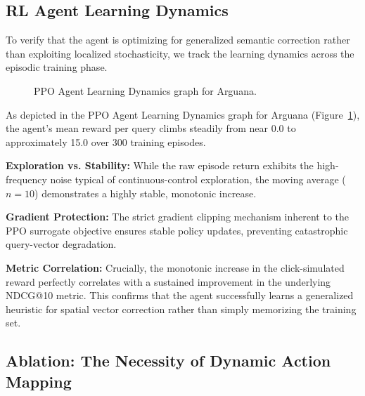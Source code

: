 \subsection{RL Agent Learning Dynamics}
To verify that the agent is optimizing for generalized semantic correction rather than exploiting localized stochasticity, we track the learning dynamics across the episodic training phase.

\begin{figure}[htbp]
  \centering
  \fbox{\rule[-.5cm]{0cm}{4cm} \rule[-.5cm]{4cm}{0cm}} %
  \caption{PPO Agent Learning Dynamics graph for Arguana.}
  \label{fig:learning_dynamics}
\end{figure}

As depicted in the PPO Agent Learning Dynamics graph for Arguana (Figure~\ref{fig:learning_dynamics}), the agent's mean reward per query climbs steadily from near 0.0 to approximately 15.0 over 300 training episodes.

\textbf{Exploration vs. Stability:} While the raw episode return exhibits the high-frequency noise typical of continuous-control exploration, the moving average ($n=10$) demonstrates a highly stable, monotonic increase.

\textbf{Gradient Protection:} The strict gradient clipping mechanism inherent to the PPO surrogate objective ensures stable policy updates, preventing catastrophic query-vector degradation.

\textbf{Metric Correlation:} Crucially, the monotonic increase in the click-simulated reward perfectly correlates with a sustained improvement in the underlying NDCG@10 metric. This confirms that the agent successfully learns a generalized heuristic for spatial vector correction rather than simply memorizing the training set.

\subsection{Ablation: The Necessity of Dynamic Action Mapping}

